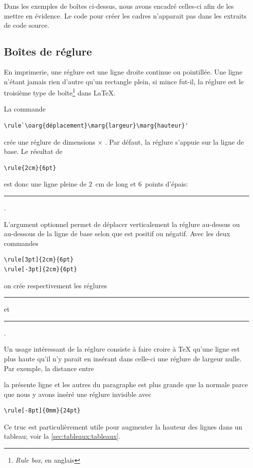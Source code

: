 \begin{rem}
  Dans les exemples de boîtes ci-dessus, nous avons encadré celles-ci
  afin de les mettre en évidence. Le code pour créer les cadres
  n'apparait pas dans les extraits de code source.
\end{rem}



\subsection{Boîtes de réglure}
\label{sec:tableaux:boites:rulebox}

En imprimerie, une réglure est une ligne droite continue ou
pointillée. Une ligne n'étant jamais rien d'autre qu'un rectangle
plein, si mince fut-il, la réglure est le troisième type de
boîte\footnote{%
  \emph{Rule box}, en anglais} %
dans {\LaTeX}.

La commande
\begin{lstlisting}
\rule`\oarg{déplacement}\marg{largeur}\marg{hauteur}'
\end{lstlisting}
crée une réglure de dimensions  $\times$ .
Par défaut, la réglure s'appuie sur la ligne de base. Le résultat de
\begin{lstlisting}
\rule{2cm}{6pt}
\end{lstlisting}
est donc une ligne pleine de $2$~cm de long et $6$~points d'épais:
\rule{2cm}{6pt}.

L'argument optionnel  permet de déplacer
verticalement la réglure au-dessus ou au-dessous de la ligne de base
selon que  est positif ou négatif. Avec les deux
commandes
\begin{lstlisting}
\rule[3pt]{2cm}{6pt}
\rule[-3pt]{2cm}{6pt}
\end{lstlisting}
on crée respectivement les réglures \rule[3pt]{2cm}{6pt} et
\rule[-3pt]{2cm}{6pt}.

Un usage intéressant de la réglure consiste à faire croire à {\TeX}
qu'une ligne est plus haute qu'il n'y parait en insérant dans celle-ci
une réglure de largeur nulle. Par exemple, la distance entre
\rule[-8pt]{0mm}{24pt}\relax la présente ligne et les autres du paragraphe est
plus grande que la normale parce que nous y avons inséré une réglure
invisible avec
\begin{lstlisting}
\rule[-8pt]{0mm}{24pt}
\end{lstlisting}
Ce truc est particulièrement utile pour augmenter la hauteur des
lignes dans un tableau; voir la \autoref{sec:tableaux:tableaux}.




